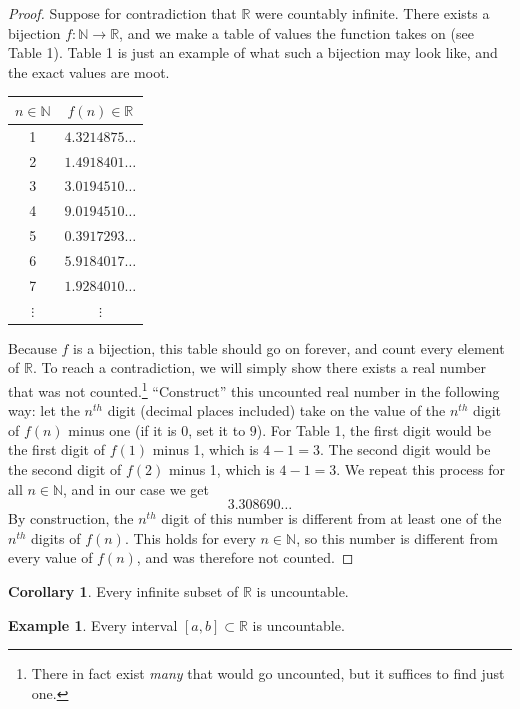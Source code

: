 \documentclass{article}
\newcommand{\N}{\mathbb{N}}
\newcommand{\R}{\mathbb{R}}
\theoremstyle{definition}
\newtheorem{corollary}{Corollary}[section]
\newtheorem{example}{Example}[section]
\begin{document}
\begin{proof}
Suppose for contradiction that $ \R $ were countably infinite. There exists a bijection $ f:\N\to\R $, and we make a table of values the function takes on (see Table 1). Table 1 is just an example of what such a bijection may look like, and the exact values are moot.
\begin{table}[h!]
	\centering
	\begin{tabular}{cc}
		$ n\in\N  $       & $ f(n)\in\R $              \\ \hline
		1        & $4.3214875\ldots$ \\
		2        & $1.4918401\ldots$           \\
		3        & $3.0194510\ldots$                   \\
		4        & $9.0194510\ldots$                  \\
		5        & $0.3917293\ldots $               \\
		6        & $ 5.9184017\ldots $\\
		7        & $ 1.9284010\ldots $                \\
		$\vdots$ & $\vdots$         
	\end{tabular}
\end{table}
Because $ f $ is a bijection, this table should go on forever, and count every element of $ \R $. To reach a contradiction, we will simply show there exists a real number that was not counted.\footnote{There in fact exist \textit{many} that would go uncounted, but it suffices to find just one.} ``Construct'' this uncounted real number in the following way: let the $ n^{th} $ digit (decimal places included) take on the value of the $ n^{th}$ digit of $ f(n) $ minus one (if it is $ 0 $, set it to $ 9 $). For Table 1, the first digit would be the first digit of $ f(1) $ minus 1, which is $ 4-1=3 $. The second digit would be the second digit of $ f(2) $ minus 1, which is $4-1=3$. We repeat this process for all $ n\in\N $, and in our case we get $$3.308690\ldots $$
By construction, the $ n^{th} $ digit of this number is different from at least one of the $ n^{th} $ digits of $ f(n) $. This holds for every $ n\in\N $, so this number is different from every value of $ f(n) $, and was therefore not counted.  
\end{proof}
\begin{corollary}
	Every infinite subset of $ \R $ is uncountable.
\end{corollary}
\begin{example}
	Every interval $ [a,b]\subset\R $ is uncountable. 
\end{example}
\end{document}
